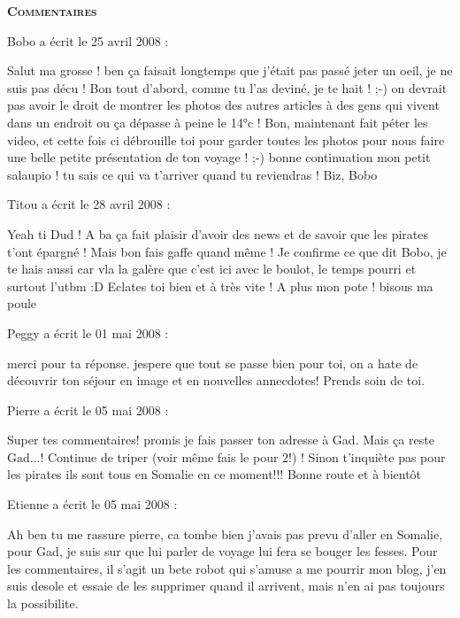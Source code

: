 \bigskip
\textbf{\textsc{Commentaires}}

 \medskip
Bobo a écrit le 25 avril 2008 :
\begin{displayquote}
Salut ma grosse ! ben ça faisait longtemps que j'était pas passé jeter un oeil, je ne suis pas décu ! 
Bon tout d'abord, comme tu l'as deviné, je te hait ! ;-) on devrait pas avoir le droit de montrer les photos des autres articles à des gens qui vivent dans un endroit ou ça dépasse à peine le 14°c !
Bon, maintenant fait péter les video, et cette fois ci débrouille toi pour garder toutes les photos pour nous faire une belle petite présentation de ton voyage ! ;-)
bonne continuation mon petit salaupio ! tu sais ce qui va t'arriver quand tu reviendras !
Biz, Bobo
\end{displayquote}

 \medskip
Titou a écrit le 28 avril 2008 :
\begin{displayquote}
Yeah ti Dud !
A ba ça fait plaisir d'avoir des news et de savoir que les pirates t'ont épargné ! Mais bon fais gaffe quand même !
Je confirme ce que dit Bobo, je te hais aussi car vla la galère que c'est ici avec le boulot, le temps pourri et surtout l'utbm :D Eclates toi bien et à très vite !
A plus mon pote !
bisous ma poule
\end{displayquote}

 \medskip
Peggy a écrit le 01 mai 2008 :
\begin{displayquote}
merci pour ta réponse. jespere que tout se passe bien pour toi, on a hate de découvrir ton séjour en image et en nouvelles annecdotes!
Prends soin de toi.
\end{displayquote}

 \medskip
Pierre a écrit le 05 mai 2008 :
\begin{displayquote}
Super tes commentaires!
promis je fais passer ton adresse à Gad.
Mais ça reste Gad...!
Continue de triper (voir même fais le pour 2!) !
Sinon t'inquiète pas pour les pirates ils sont tous en Somalie en ce moment!!!
Bonne route et à bientôt
\end{displayquote}

 \medskip
Etienne a écrit le 05 mai 2008 :
\begin{displayquote}
Ah ben tu me rassure pierre, ca tombe bien j'avais pas prevu d'aller en Somalie, pour Gad, je suis sur que lui parler de voyage lui fera se bouger les fesses.
Pour les commentaires, il s'agit un bete robot qui s'amuse a me pourrir mon blog, j'en suis desole et essaie de les supprimer quand il arrivent, mais n'en ai pas toujours la possibilite.
\end{displayquote}

